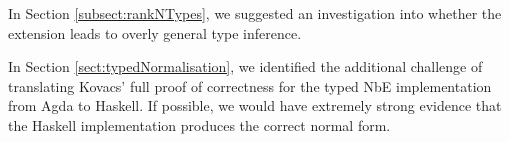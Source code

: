 In Section \ref{subsect:rankNTypes}, we suggested an investigation into whether the  extension leads to overly general type inference.

In Section \ref{sect:typedNormalisation}, we identified the additional challenge of translating Kovacs' full proof of correctness for the typed NbE implementation from Agda to Haskell. If possible, we would have extremely strong evidence that the Haskell  implementation produces the correct normal form. 

